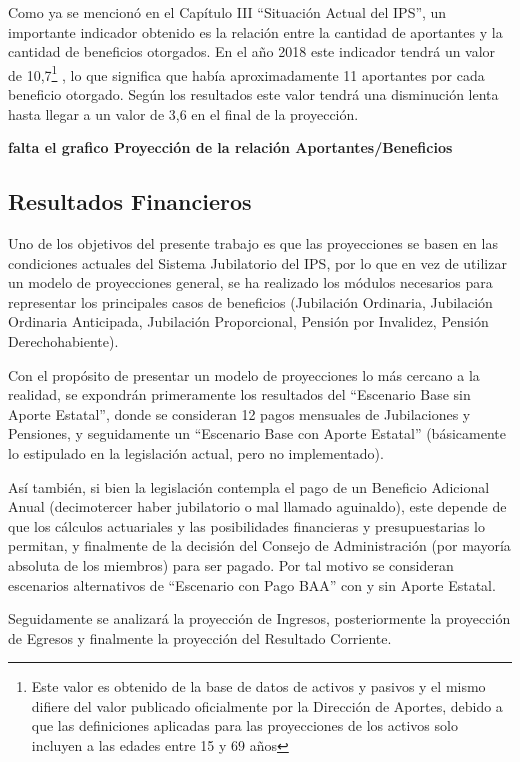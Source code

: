 \documentclass[a4paper,11pt]{article}
\begin{document}
Como ya se mencionó en el Capítulo III “Situación Actual del IPS”, un importante indicador obtenido es la relación entre la cantidad de aportantes y la cantidad de beneficios otorgados. En el año 2018 este indicador tendrá un valor de 10,7\footnote{Este valor es obtenido de la base de datos de activos y pasivos y el mismo difiere del valor publicado oficialmente por la Dirección de Aportes, debido a que las definiciones aplicadas para las proyecciones de los activos solo incluyen a las edades entre 15 y 69 años} , lo que significa que había aproximadamente 11 aportantes por cada beneficio otorgado. Según los resultados este valor tendrá una disminución lenta hasta llegar a un valor de 3,6 en el final de la proyección.

\textbf{falta el grafico Proyección de la relación Aportantes/Beneficios}

\subsection{Resultados Financieros}

Uno de los objetivos del presente trabajo es que las proyecciones se basen en las condiciones actuales del Sistema Jubilatorio del IPS, por lo que en vez de utilizar un modelo de proyecciones general, se ha realizado los módulos necesarios para representar los principales casos de beneficios (Jubilación Ordinaria, Jubilación Ordinaria Anticipada, Jubilación Proporcional, Pensión por Invalidez, Pensión Derechohabiente).

Con el propósito de presentar un modelo de proyecciones lo más cercano a la realidad, se expondrán primeramente los resultados del “Escenario Base sin Aporte Estatal”, donde se consideran 12 pagos mensuales de Jubilaciones y Pensiones, y seguidamente un “Escenario Base con Aporte Estatal” (básicamente lo estipulado en la legislación actual, pero no implementado).

Así también, si bien la legislación contempla el pago de un Beneficio Adicional Anual (decimotercer haber jubilatorio o mal llamado aguinaldo), este depende de que los cálculos actuariales y las posibilidades financieras y presupuestarias lo permitan, y finalmente de la decisión del Consejo de Administración (por mayoría absoluta de los miembros) para ser pagado.  Por tal motivo se consideran escenarios alternativos de “Escenario con Pago BAA” con y sin Aporte Estatal.

Seguidamente se analizará la proyección de Ingresos, posteriormente la proyección de Egresos y finalmente la proyección del Resultado Corriente.
\end{document}
